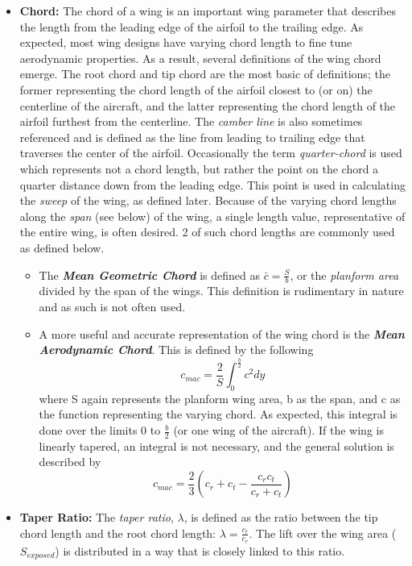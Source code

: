 \documentclass{report}
\begin{document}
\begin{itemize}
    The wing area is an important parameter as it affects the fundamental parameters of flight, 
    including lift, drag, and stall speed. As a result, an important understanding regarding the 
    wing area geometry is important so that correct area definitions are used in conjunction with
    correct applications.
    \item[] \textbf{Chord:} The chord of a wing is an important wing parameter that describes the length 
    from the leading edge of the airfoil to the trailing edge. As expected, most wing designs have 
    varying chord length to fine tune aerodynamic properties. As a result, several definitions of the wing
    chord emerge. The root chord and tip chord are the most basic of definitions; the former 
    representing the chord length of the airfoil closest to (or on) the centerline of the aircraft, 
    and the latter representing the chord length of the airfoil furthest from the centerline.
    The \textit{camber line} is also sometimes referenced and is defined as the line from leading to trailing edge that traverses the center of the airfoil. 
    Occasionally the term \textit{quarter-chord} is used which represents not a chord length, but rather the point
    on the chord a quarter distance down from the leading edge. This point is used in calculating the \textit{sweep}
    of the wing, as defined later. Because of the varying chord lengths along the \textit{span} (see below) of the wing,
    a single length value, representative of the entire wing, is often desired. 2 of such chord lengths are commonly
    used as defined below.
    \begin{itemize}
        \item The \textbf{\textit{Mean Geometric Chord}} is defined as $\bar{c} = \frac{S}{b}$, or the \textit{planform area} divided
        by the span of the wings. This definition is rudimentary in nature and as such is not often used.
        \item A more useful and accurate representation of the wing chord is the \textbf{\textit{Mean Aerodynamic Chord}}.
        This is defined by the following
        \begin{equation}
        c_{mac} = \frac{2}{S} \int_{0}^{\frac{b}{2}} c^2 dy
        \end{equation}
        where S again represents the planform wing area, b as the span, and c as the function representing the varying chord.
        As expected, this integral is done over the limits 0 to $\frac{b}{2}$ (or one wing of the aircraft). If the wing is 
        linearly tapered, an integral is not necessary, and the general solution is described by
        \begin{equation}
        c_{mac} = \frac{2}{3}\left(c_r + c_t - \frac{c_r c_t}{c_r + c_t}\right)
        \end{equation}
    \end{itemize}
    \item[] \textbf{Taper Ratio:} The \textit{taper ratio}, $\lambda$, is defined as the ratio between the tip chord
    length and the root chord length: $\lambda = \frac{c_t}{c_r}$. The lift over the wing area ($S_{exposed}$) is distributed in
    a way that is closely linked to this ratio.


\end{itemize}
\end{document}
